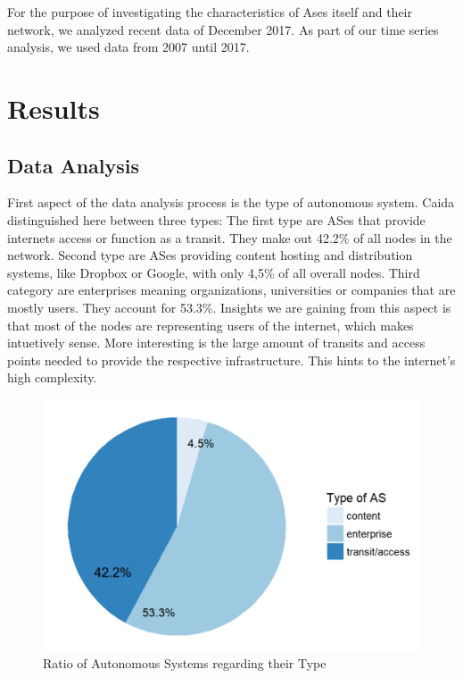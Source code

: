 \documentclass[conference]{IEEEtran}
\begin{document}
For the purpose of investigating the characteristics of Ases itself and their network, we analyzed recent data of December 2017.  As part of our time series analysis, we used data from 2007 until 2017. 


\section{Results}

\subsection{Data Analysis}
First aspect of the data analysis process is the type of autonomous system. Caida distinguished here between three types: The first type are ASes that provide internets access or function as a transit. They make out 42.2\% of all nodes in the network. Second type are ASes providing content hosting and distribution systems, like Dropbox or Google, with only 4,5\% of all overall nodes. Third category are enterprises meaning organizations, universities or companies that are mostly users. They account for 53.3\%. Insights we are gaining from this aspect is that most of the nodes are representing users of the internet, which makes intuetively sense. More interesting is the large amount of transits and access points needed to provide the respective infrastructure. This hints to the internet's high complexity. 


\begin{figure}[htbp]
\centerline{\includegraphics[scale=0.4]{Graphics/typeofAS.PNG}}
\caption{Ratio of Autonomous Systems regarding their Type }
\label{fig}
\end{figure}
\end{document}
